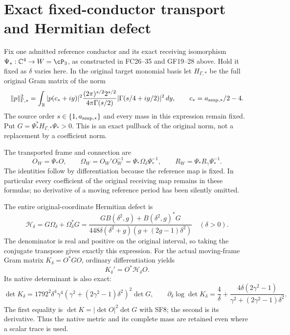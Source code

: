 \documentclass[11pt]{article}
\newcommand{\C}{\mathbb C}
\begin{document}
\section{Exact fixed-conductor transport and Hermitian defect}
Fix one admitted reference conductor and its exact receiving
isomorphism $\Psi_*:\C^4\to W=\cP_3$, as constructed in
FC26--35 and GF19--28 above. Hold it fixed as $\delta$ varies here.
In the original target monomial basis let $H_{\Gamma,*}$ be
the full original Gram matrix of the norm
\[
 \|p\|_{\Gamma,*}^2=\int_{\mathbb R}|p(c_*+iy)|^2
 \frac{(2\pi)^{s/2}2^{s/2}}{4\pi\Gamma(s/2)}
 |\Gamma(s/4+iy/2)|^2\,dy,
 \qquad c_*=a_{\rm amp,*}/2-4.
\]
The source order $s\in\{1,a_{\rm amp,*}\}$ and every mass
in this expression remain fixed. Put
$G=\Psi_*^*H_{\Gamma,*}\Psi_*>0$. This is an exact pullback
of the original norm, not a replacement by a coefficient norm.

The transported frame and connection are
\begin{equation}
 O_W=\Psi_*O,\qquad
 \Omega_W=O_W'O_W^{-1}=\Psi_*\Omega_\delta\Psi_*^{-1},
 \qquad R_W=\Psi_*R_\gamma\Psi_*^{-1}.
 \tag{SF14}
\end{equation}
The identities follow by differentiation because the reference
map is fixed. In particular every coefficient of the original
receiving map remains in these formulas; no derivative of a
moving reference period has been silently omitted.

The entire original-coordinate Hermitian defect is
\begin{equation}
 \mathscr H_\delta=G\Omega_\delta+\Omega_\delta^*G
    =\frac{G B(\delta^2,g)+B(\delta^2,g)^*G}
                 {448\delta(\delta^2+g)(g+(2g-1)\delta^2)}
 \quad(\delta>0).
 \tag{SF15}
\end{equation}
The denominator is real and positive on the original interval,
so taking the conjugate transpose gives exactly this expression.
For the actual moving-frame Gram matrix $K_\delta=O^*GO$,
ordinary differentiation yields
\begin{equation}
 K_\delta'=O^*\mathscr H_\delta O.
 \tag{SF16}
\end{equation}
Its native determinant is also exact:
\[
 \det K_\delta=1792^2\delta^4\gamma^4
       (\gamma^2+(2\gamma^2-1)\delta^2)^2\det G,
 \qquad
 \partial_\delta\log\det K_\delta
  =\frac4\delta+
    \frac{4\delta(2\gamma^2-1)}{\gamma^2+(2\gamma^2-1)\delta^2}.
\]
The first equality is $\det K=|\det O|^2\det G$ with SF8;
the second is its derivative. Thus the native metric and its
complete mass are retained even where a scalar trace is used.
\end{document}
